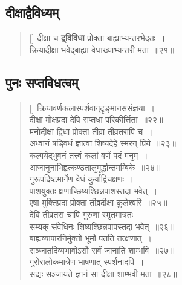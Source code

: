 \documentclass[twoside,12pt,notitlepage]{book}
\begin{document}
\subsection*{दीक्षाद्वैविध्यम्}
\begin{verse}[\versewidth]
दीक्षा च \textbf{\b द्विविधा} प्रोक्ता बाह्याभ्यन्तरभेदतः~।\\[-6pt]
क्रियादीक्षा भवेद्बाह्या वेधाख्याभ्यन्तरी मता~॥२१॥
\end{verse}

\subsection*{पुनः सप्तविधत्वम्}
\begin{verse}[\versewidth]
\footA क्रियावर्णकलास्पर्शवाग्‌दृङ्मानससंज्ञया~।\\[-6pt]
दीक्षा मोक्षप्रदा देवि सप्तधा परिकीर्त्तिता~॥२२॥\\
मनोदीक्षा द्विधा प्रोक्ता तीव्रा तीव्रतरापि च~।\\[-6pt]
अध्वानं षड्विधं ज्ञात्वा शिष्यदेहे स्मरन् प्रिये~॥२३॥\\
कल्पयेद्भुवनं तत्त्वं कलां वर्णं पदं मनुम्~।\\[-6pt]
आजानुनाभिहृत्कण्ठतालुमूर्द्धान्तमम्बिके~॥२४॥\\
गुरूपदिष्टमार्गेण वेधं कुर्याद्विचक्षणः~।\\[-6pt]
पाशयुक्तः क्षणाच्छिष्यश्छिन्नपाशस्तदा भवेत्~।\\[-6pt]
एषा मुक्तिप्रदा प्रोक्ता तीव्रदीक्षा कुलेश्वरि~॥२५॥\\
देवि तीव्रतरा चापि गुरुणा स्मृतमात्रतः~।\\[-6pt]
सम्यक् संवेधिनः शिष्यश्छिन्नपापस्तदा भवेत्~॥२६॥\\
बाह्यव्यापारनिर्मुक्तो भूमौ पतति तत्क्षणात्~।\\[-6pt]
सञ्जातदिव्यभावोऽसौ सर्वं जानाति शाम्भवि~॥२७॥\\
गुरोरालोकमात्रेण भाषणात् स्पर्शनादपि~।\\[-6pt]
सद्यः सञ्जायते ज्ञानं सा दीक्षा शाम्भवी मता~॥२८॥

\end{verse}
\end{document}
